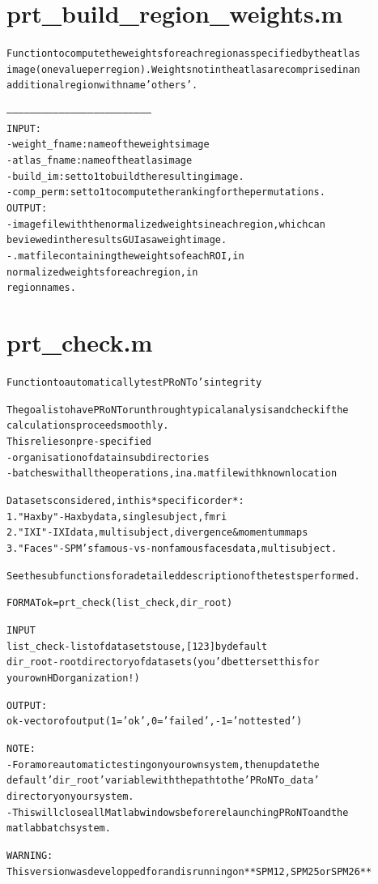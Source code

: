 \section{prt\_build\_region\_weights.m}
\begin{alltt}

 Function to compute the weights for each region as specified by the atlas
 image (one value per region). Weights not in the atlas are comprised in an
 additional region with name 'others'.
 
 --------------------------------------------------------------------------
 INPUT : 
   - weight\_fname : name of the weights image
   - atlas\_fname  : name of the atlas image
   - build\_im     : set to 1 to build the resulting image.
   - comp\_perm    : set to 1 to compute the ranking for the permutations.
 OUTPUT: 
   - image file with the normalized weights in each region, which can
           be viewed in the results GUI as a weight image.
   - .mat file containing the weights of each ROI, in %
           normalized weights for each region, in %
           region names.
\end{alltt}


\section{prt\_check.m}
\begin{alltt}

 Function to automatically test PRoNTo's integrity
 
 The goal is to have PRoNTo run through typical analysis and check if the
 calculations proceed smoothly.
 This relies on pre-specified 
 - organisation of data in subdirectories
 - batches with all the operations, in a .mat file with known location
 
 Data sets considered, in this *specific order*:
 1. "Haxby" - Haxby data, single subject, fmri 
 2. "IXI"   - IXI data, multi subject, divergence \& momentum maps
 3. "Faces" - SPM's famous-vs-nonfamous faces data, multi subject.
 
 See the subfunctions for a detailed description of the tests performed.
 
 FORMAT ok = prt\_check(list\_check,dir\_root)
 
 INPUT
   list\_check  - list of data sets to use, [1 2 3] by default
   dir\_root    - root directory of data sets (you'd better set this for
                 your own HD organization!)
 
 OUTPUT:
   ok          - vector of output (1='ok', 0='failed', -1='not tested')
 
 NOTE:
 - For a more automatic testing on your own system, then up date the
   default 'dir\_root' variable with the path to the 'PRoNTo\_data'
   directory on your system.
 - This will close all Matlab windows before relaunching PRoNTo and the
   matlabbatch system.
 
 WARNING:
 {\color{black}This version was developped for and is running on **SPM12, SPM25 or SPM26**} 
 
\end{alltt}



